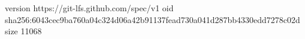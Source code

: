 version https://git-lfs.github.com/spec/v1
oid sha256:6043cec9ba760a04c324d06a42b91137fead730a041d287bb4330edd7278c02d
size 11068
